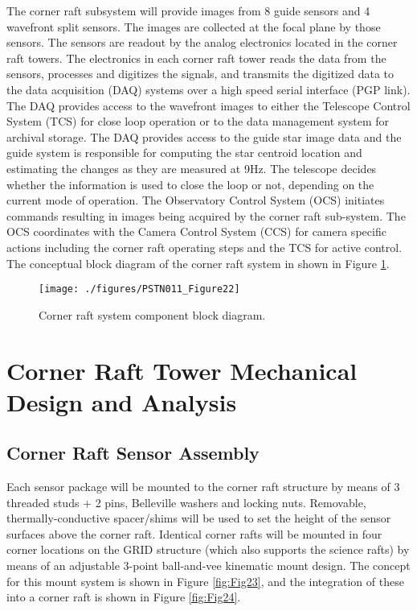 The corner raft subsystem will provide images from 8 guide sensors and 4 wavefront split sensors. The
images are collected at the focal plane by those sensors. The sensors are readout by the analog
electronics located in the corner raft towers. The electronics in each corner raft tower reads the data
from the sensors, processes and digitizes the signals, and transmits the digitized data to the data
acquisition (DAQ) systems over a high speed serial interface (PGP link). The DAQ provides access to the
wavefront images to either the Telescope Control System (TCS) for close loop operation or to the data
management system for archival storage. The DAQ provides access to the guide star image data and the
guide system is responsible for computing the star centroid location and estimating the changes as they
are measured at 9Hz. The telescope decides whether the information is used to close the loop or not,
depending on the current mode of operation. The Observatory Control System (OCS) initiates
commands resulting in images being acquired by the corner raft sub-system. The OCS coordinates with
the Camera Control System (CCS) for camera specific actions including the corner raft operating steps
and the TCS for active control. The conceptual block diagram of the corner raft system in shown in Figure \ref{fig:Fig22}.

\begin{figure}[htbp]
\begin{center}
\texttt{[image: ./figures/PSTN011\_Figure22]}
\caption{Corner raft system component block diagram.}
\label{fig:Fig22}
\end{center}
\end{figure}

\section{Corner Raft Tower Mechanical Design and Analysis}

\subsection{Corner Raft Sensor Assembly}
Each sensor package will be mounted to the corner raft structure by means of 3 threaded studs + 2 pins,
Belleville washers and locking nuts. Removable, thermally-conductive spacer/shims will be used to set
the height of the sensor surfaces above the corner raft. Identical corner rafts will be mounted in four
corner locations on the GRID structure (which also supports the science rafts) by means of an adjustable
3-point ball-and-vee kinematic mount design. The concept for this mount system is shown in Figure \ref{fig:Fig23}, 
and the integration of these into a corner raft is shown in Figure \ref{fig:Fig24}.

